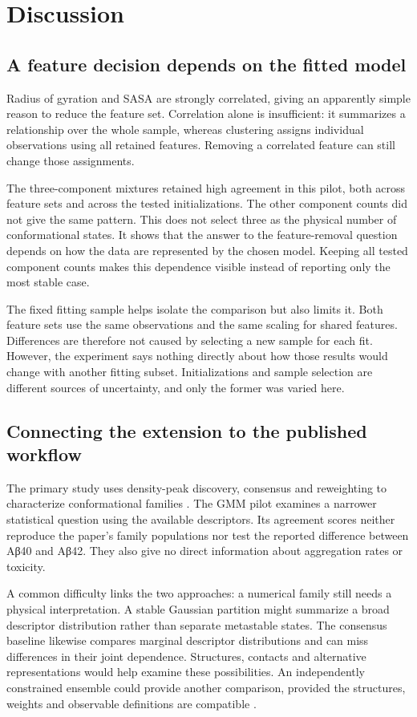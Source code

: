 \chapter{Discussion}
\section{A feature decision depends on the fitted model}
Radius of gyration and SASA are strongly correlated, giving an apparently simple reason to reduce the feature set. Correlation alone is insufficient: it summarizes a relationship over the whole sample, whereas clustering assigns individual observations using all retained features. Removing a correlated feature can still change those assignments.

The three-component mixtures retained high agreement in this pilot, both across feature sets and across the tested initializations. The other component counts did not give the same pattern. This does not select three as the physical number of conformational states. It shows that the answer to the feature-removal question depends on how the data are represented by the chosen model. Keeping all tested component counts makes this dependence visible instead of reporting only the most stable case.

The fixed fitting sample helps isolate the comparison but also limits it. Both feature sets use the same observations and the same scaling for shared features. Differences are therefore not caused by selecting a new sample for each fit. However, the experiment says nothing directly about how those results would change with another fitting subset. Initializations and sample selection are different sources of uncertainty, and only the former was varied here.

\section{Connecting the extension to the published workflow}
The primary study uses density-peak discovery, consensus and reweighting to characterize conformational families \autocite{cadenelli2026}. The GMM pilot examines a narrower statistical question using the available descriptors. Its agreement scores neither reproduce the paper's family populations nor test the reported difference between Aβ40 and Aβ42. They also give no direct information about aggregation rates or toxicity.

A common difficulty links the two approaches: a numerical family still needs a physical interpretation. A stable Gaussian partition might summarize a broad descriptor distribution rather than separate metastable states. The consensus baseline likewise compares marginal descriptor distributions and can miss differences in their joint dependence. Structures, contacts and alternative representations would help examine these possibilities. An independently constrained ensemble could provide another comparison, provided the structures, weights and observable definitions are compatible \autocite{borthakur2025}.

